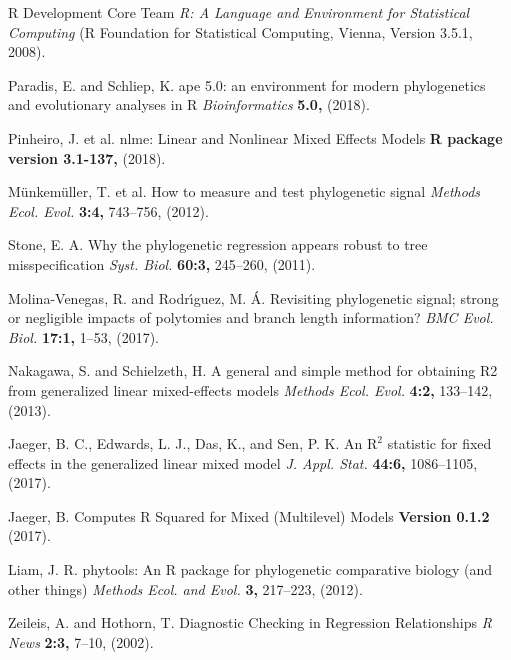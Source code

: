 \documentclass[twocolumn, linenumbers, superscriptaddress, nofootinbib]{revtex4-1}
\begin{document}
\begin{thebibliography}{50}
				R Development Core Team
				\textit{R: A Language and Environment for Statistical Computing}
				(R Foundation for Statistical Computing,
				Vienna,
				Version 3.5.1,
				2008).
			
				Paradis, E. and Schliep, K.
				ape 5.0: an environment for modern phylogenetics and evolutionary analyses in R
				\textit{Bioinformatics}
				\textbf{5.0,}
				(2018).
			
				Pinheiro, J. et al.
				nlme: Linear and Nonlinear Mixed Effects Models
				\textbf{R package version 3.1-137,}
				(2018).
			
				M{\"u}nkem{\"u}ller, T. et al.
				How to measure and test phylogenetic signal
				\textit{Methods Ecol. Evol.}
				\textbf{3:4,}
				743--756,
				(2012).
			
				Stone, E. A.
				Why the phylogenetic regression appears robust to tree misspecification
				\textit{Syst. Biol.}
				\textbf{60:3,}
				245--260,
				(2011).
			
				Molina-Venegas, R. and Rodr{\'\i}guez, M. {\'A}.
				Revisiting phylogenetic signal; strong or negligible impacts of polytomies and branch length information?
				\textit{BMC Evol. Biol.}
				\textbf{17:1,}
				1--53,
				(2017).			
			
				Nakagawa, S. and Schielzeth, H.
				A general and simple method for obtaining R2 from generalized linear mixed-effects models
				\textit{Methods Ecol. Evol.}
				\textbf{4:2,}
				133--142,
				(2013).
		
				Jaeger, B. C., Edwards, L. J., Das, K., and Sen, P. K.
				An $\text{R}^2$ statistic for fixed effects in the generalized linear mixed model
				\textit{J. Appl. Stat.}
				\textbf{44:6,}
				1086--1105,
				(2017).
			
				Jaeger, B.
				Computes R Squared for Mixed (Multilevel) Models
				\textbf{Version 0.1.2}
				(2017).
			
				Liam, J. R.
				phytools: An R package for phylogenetic comparative biology (and other things)
				\textit{Methods Ecol. and Evol.}
				\textbf{3,}
				217--223,
				(2012).
		
				Zeileis, A. and Hothorn, T.
				Diagnostic Checking in Regression Relationships
				\textit{R News}
				\textbf{2:3,}
				7--10,
				(2002).
	\end{thebibliography}
\end{document}
